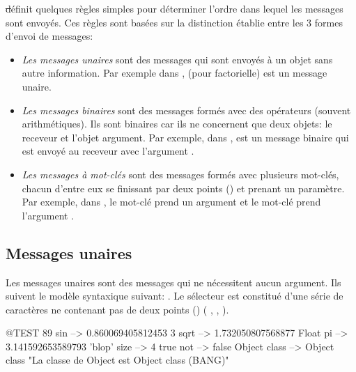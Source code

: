 \documentclass[a4paper,10pt,twoside]{book}
\begin{document}
\st d\'efinit quelques r\`egles simples pour d\'eterminer l'ordre dans lequel les messages sont envoy\'es. Ces r\`egles sont bas\'ees sur la distinction \'etablie entre les 3 formes d'envoi de messages: 
\begin{itemize}
\item \emph{Les messages unaires} sont des messages qui sont envoy\'es
  \`a un objet sans autre information. Par exemple dans ,  (pour factorielle) est un message unaire. 
\item  \emph{Les messages binaires} sont des messages form\'es avec
  des op\'erateurs (souvent arithm\'etiques). Ils sont binaires car
  ils ne concernent que deux objets: le receveur et l'objet
  argument. Par exemple, dans , \ct{+} est un message
  binaire qui est envoy\'e au receveur  avec l'argument . 
\item  \emph{Les messages \`a mot-cl\'es} sont des messages form\'es avec plusieurs mot-cl\'es, chacun d'entre eux se finissant par deux points (\ct{:}) et prenant un param\`etre.
Par exemple, dans , le mot-cl\'e 
prend un argument  et le mot-cl\'e  prend l'argument .
\end{itemize}

\subsection{Messages unaires}
Les messages unaires sont des messages qui ne n\'ecessitent aucun
argument. Ils suivent le mod\`ele syntaxique suivant: . Le s\'electeur est constitu\'e d'une s\'erie de
caract\`eres ne contenant pas de deux points (\ct{:}) (\eg
{}, , ).
\begin{code}{@TEST}
89 sin           --> 0.860069405812453
3 sqrt           --> 1.732050807568877
Float pi         --> 3.141592653589793
'blop' size     --> 4
true not        --> false
Object class --> Object class  "La classe de Object est Object class (BANG)"
\end{code}


\end{document}
